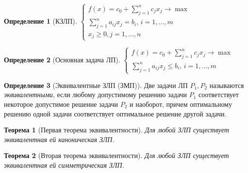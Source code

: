 \documentclass[a4paper]{article}
\newtheorem{theorem}{Теорема}[section]
\theoremstyle{definition}
\newtheorem*{definition}{Определение}
\theoremstyle{remark}
\begin{document}
\begin{definition}[КЗЛП]
    $\begin{cases}
        f(x) = c_0 + \sum_{j = 1}^n c_j x_j \to \max\\
        \sum_{j = 1}^{n} a_{ij}x_j =b_i, \, i = 1, \dots, m \\ 
        x_j \geq 0, j = 1, \dots, n
    \end{cases}$
\end{definition}
\begin{definition}[Основная задача ЛП]
    $\begin{cases}
        f(x) = c_0 + \sum_{j = 1}^n c_j x_j \to \max\\
        \sum_{j = 1}^{n} a_{ij}x_j \leq b_i, \, i = 1, \dots, m
    \end{cases}$
\end{definition}
\begin{definition}[Эквивалентные ЗЛП (ЗМП)]
    Две задачи ЛП $P_1, P_2$ называются \textit{эквивалентными}, если любому допустимому решению задачи $P_1$ соответствует некоторое допустимое решение задачи $P_2$ и наоборот, причем оптимальному решению одной задачи соответствует оптимальное решение другой задачи.
\end{definition}
\begin{theorem}[Первая теорема эквивалентности]
    Для любой ЗЛП существует эквивалентная ей каноническая ЗЛП.
\end{theorem}
\begin{theorem}[Вторая теорема эквивалентности]
    Для любой ЗЛП существует эквивалентная ей симметрическая ЗЛП.
\end{theorem}
\end{document}
